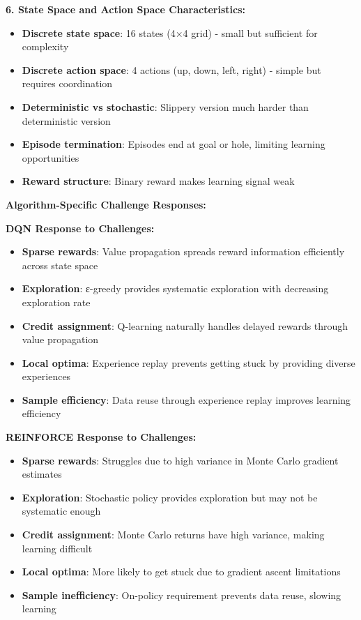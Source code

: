 \documentclass[12pt]{article}
\begin{document}
{{{\textbf{6. State Space and Action Space Characteristics:}
\begin{itemize}
    \item \textbf{Discrete state space}: 16 states (4×4 grid) - small but sufficient for complexity
    \item \textbf{Discrete action space}: 4 actions (up, down, left, right) - simple but requires coordination
    \item \textbf{Deterministic vs stochastic}: Slippery version much harder than deterministic version
    \item \textbf{Episode termination}: Episodes end at goal or hole, limiting learning opportunities
    \item \textbf{Reward structure}: Binary reward makes learning signal weak
\end{itemize}

\textbf{Algorithm-Specific Challenge Responses:}

\textbf{DQN Response to Challenges:}
\begin{itemize}
    \item \textbf{Sparse rewards}: Value propagation spreads reward information efficiently across state space
    \item \textbf{Exploration}: ε-greedy provides systematic exploration with decreasing exploration rate
    \item \textbf{Credit assignment}: Q-learning naturally handles delayed rewards through value propagation
    \item \textbf{Local optima}: Experience replay prevents getting stuck by providing diverse experiences
    \item \textbf{Sample efficiency}: Data reuse through experience replay improves learning efficiency
\end{itemize}

\textbf{REINFORCE Response to Challenges:}
\begin{itemize}
    \item \textbf{Sparse rewards}: Struggles due to high variance in Monte Carlo gradient estimates
    \item \textbf{Exploration}: Stochastic policy provides exploration but may not be systematic enough
    \item \textbf{Credit assignment}: Monte Carlo returns have high variance, making learning difficult
    \item \textbf{Local optima}: More likely to get stuck due to gradient ascent limitations
    \item \textbf{Sample inefficiency}: On-policy requirement prevents data reuse, slowing learning
\end{itemize}

}}}
\end{document}
